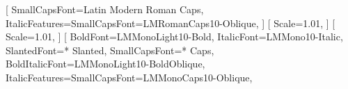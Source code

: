 \usepackage{lmodern}%
%
\usepackage{fontspec}%
\usepackage[warnings-off={mathtools-colon,mathtools-overbracket},math-style=ISO,bold-style=ISO]{unicode-math}%
\newcommand{\DenKrFontEngine}{fontspec}%
\setmainfont{Latin Modern Roman}[%
	SmallCapsFont={Latin Modern Roman Caps},%
	ItalicFeatures={SmallCapsFont=LMRomanCaps10-Oblique},%
]%
\setmainfont{LinuxLibertine O}[%
	Scale=1.01,%
]%
\setsansfont{Linux Biolinum O}[%
	Scale=1.01,%
]%
\setmonofont{Latin Modern Mono}[%
	BoldFont={LMMonoLight10-Bold},%
	ItalicFont={LMMono10-Italic},%
	SlantedFont={* Slanted},%
	SmallCapsFont={* Caps},%
	BoldItalicFont={LMMonoLight10-BoldOblique},%
	ItalicFeatures={SmallCapsFont=LMMonoCaps10-Oblique},%
